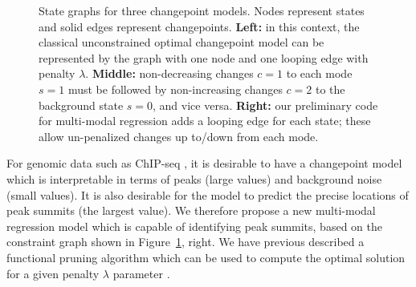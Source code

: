 \documentclass{article}
\begin{document}
\begin{figure}
\begin{minipage}{2in}
  \end{minipage}
  \caption{State graphs for three changepoint models. Nodes represent
    states and solid edges represent changepoints. \textbf{Left:} in
    this context, the classical unconstrained optimal changepoint
    model can be represented by the graph with one node and one
    looping edge with penalty $\lambda$. \textbf{Middle:}
    non-decreasing changes $c=1$ to each mode $s=1$ must be followed
    by non-increasing changes $c=2$ to the background state $s=0$, and
    vice versa. \textbf{Right:} our preliminary code for multi-modal
    regression adds a looping edge for each state; these allow
    un-penalized changes up to/down from each mode.}
  \label{fig:state-graph}
\end{figure}

For genomic data such as ChIP-seq \citep{chip-seq}, it is desirable to
have a changepoint model which is interpretable in terms of peaks
(large values) and background noise (small values). It is also
desirable for the model to predict the precise locations of peak
summits (the largest value). We therefore propose a new multi-modal
regression model which is capable of identifying peak summits, based
on the constraint graph shown in Figure~\ref{fig:state-graph},
right. We have previous described a functional pruning algorithm which
can be used to compute the optimal solution for a given penalty
$\lambda$ parameter \citep{Hocking-constrained-changepoint-detection}.
\end{document}
